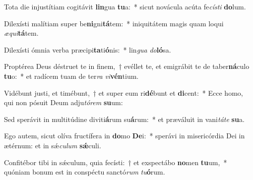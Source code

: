 \item Tota die injustítiam cogitávit \textbf{lin}gua \textbf{tu}a:~* sicut novácula acúta fe\textit{cís}\textit{ti} \textbf{do}lum.
\item Dilexísti malítiam super be\textbf{ni}gni\textbf{tá}tem:~* iniquitátem magis quam loqui \textit{æ}\textit{qui}\textbf{tá}tem.
\item Dilexísti ómnia verba præcipi\textbf{ta}ti\textbf{ó}nis:~* lin\textit{gua} \textit{do}\textbf{ló}sa.
\item Proptérea Deus déstruet te in finem,~† evéllet te, et emigrábit te de taber\textbf{ná}culo \textbf{tu}o:~* et radícem tuam de ter\textit{ra} \textit{vi}\textbf{vén}tium.
\item Vidébunt justi, et timébunt,~† et super eum ri\textbf{dé}bunt et \textbf{di}cent:~* Ecce homo, qui non pósuit Deum adju\textit{tó}\textit{rem} \textbf{su}um:
\item Sed sperávit in multitúdine diviti\textbf{á}rum su\textbf{á}rum:~* et præváluit in vani\textit{tá}\textit{te} \textbf{su}a.
\item Ego autem, sicut olíva fructífera in \textbf{do}mo \textbf{De}i:~* sperávi in misericórdia Dei in ætérnum: et in sǽ\textit{cu}\textit{lum} \textbf{sǽ}culi.
\item Confitébor tibi in sǽculum, quia fecísti:~† et exspectábo \textbf{no}men \textbf{tu}um,~* quóniam bonum est in conspéctu sanctó\textit{rum} \textit{tu}\textbf{ó}rum.
